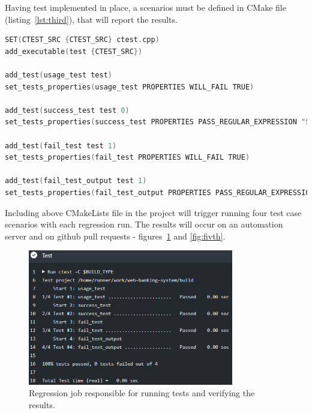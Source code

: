 \documentclass[a4paper,12pt]{book}
\begin{document}
{\bigskip Having test implemented in place, a scenarios must be defined in CMake file (listing~\ref{lst:third}), that will report the results. 
\bigskip
\begin{lstlisting}[frame=single, label={lst:third}, basicstyle=\small, language=C++, caption={Example CMakeLists file used to define scenarios. In first two lines source code file and executable are set. Then by callig add test a scenario is added with input arguments. In the next lines, set test properties will define expected behaviour.}, captionpos=b]
SET(CTEST_SRC {CTEST_SRC} ctest.cpp)
add_executable(test {CTEST_SRC})

add_test(usage_test test)
set_tests_properties(usage_test PROPERTIES WILL_FAIL TRUE)

add_test(success_test test 0)
set_tests_properties(success_test PROPERTIES PASS_REGULAR_EXPRESSION "SUCCESS")

add_test(fail_test test 1)
set_tests_properties(fail_test PROPERTIES WILL_FAIL TRUE)

add_test(fail_test_output test 1)
set_tests_properties(fail_test_output PROPERTIES PASS_REGULAR_EXPRESSION "FAIL")
\end{lstlisting}

\bigskip Including above CMakeLists file in the project will trigger running four test case scenarios with each regression run. The results will occur on an automation server and on github pull requests - figures~\ref{fig:fourth} and \ref{fig:fivth}.

\begin{figure}[H]
  \centering
    \includegraphics[width=0.8\textwidth]{testreg}
    \caption{Regression job responsible for running tests and verifying the results.}
    \label{fig:fourth}
\end{figure}
}
\end{document}
